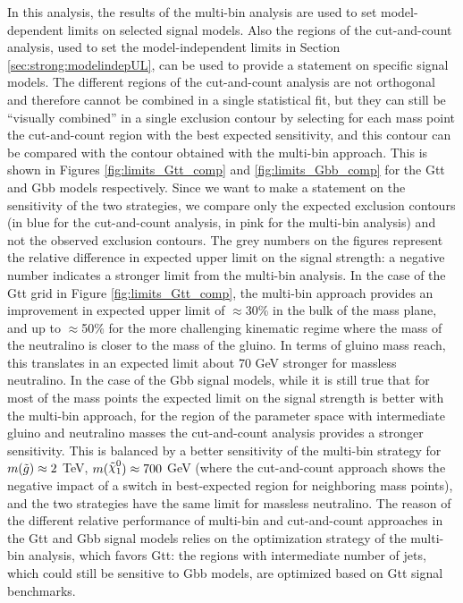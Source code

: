 In this analysis, the results of the multi-bin analysis are used to set model-dependent limits on selected signal models.
Also the regions of the cut-and-count analysis, used to set the model-independent limits in Section \ref{sec:strong:modelindepUL}, 
can be used to provide a statement on specific signal models. The different regions of the cut-and-count analysis are not orthogonal 
and therefore cannot be combined in a single statistical fit, but they can still be ``visually combined'' in a single exclusion contour 
by selecting for each mass point the cut-and-count region with the best expected sensitivity, and this contour can be compared 
with the contour obtained with the multi-bin approach.
This is shown in Figures \ref{fig:limits_Gtt_comp} and \ref{fig:limits_Gbb_comp} for the Gtt and Gbb models respectively.
Since we want to make a statement on the sensitivity of the two strategies, we compare only the expected exclusion contours 
(in blue for the cut-and-count analysis, in pink for the multi-bin analysis) and not the observed exclusion contours. 
The grey numbers on the figures represent the relative difference in expected upper limit on the signal strength: 
a negative number indicates a stronger limit from the multi-bin analysis. 
In the case of the Gtt grid in Figure \ref{fig:limits_Gtt_comp}, the multi-bin approach provides an improvement in 
expected upper limit of $\approx$30\% in the bulk of the mass plane, and up to $\approx$50\% for the more challenging 
kinematic regime where the mass of the neutralino is closer to the mass of the gluino.
In terms of gluino mass reach, this translates in an expected limit about 70 GeV stronger for massless neutralino.
In the case of the Gbb signal models, while it is still true that for most of the mass points the expected limit on the 
signal strength is better with the multi-bin approach, for the region of the parameter space with intermediate gluino and 
neutralino masses the cut-and-count analysis provides a stronger sensitivity.
This is balanced by a better sensitivity of the multi-bin strategy for $m(\tilde{g}) \approx 2$ TeV, $m(\ninoone) \approx 700$
GeV (where the cut-and-count approach shows the negative impact of a switch in best-expected region for neighboring mass points),
and the two strategies have the same limit for massless neutralino. 
The reason of the different relative performance of multi-bin and cut-and-count approaches in the Gtt and Gbb signal 
models relies on the optimization strategy of the multi-bin analysis, which favors Gtt: the regions with intermediate 
number of jets, which could still be sensitive to Gbb models, are optimized based on Gtt signal benchmarks.




